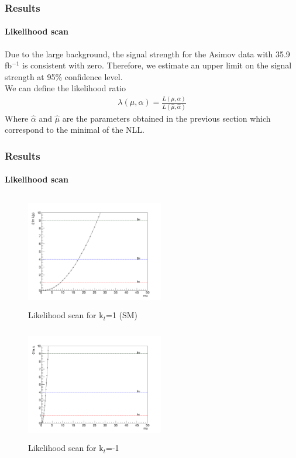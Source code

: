\documentclass[11pt]{beamer}
\begin{document}
\begin{frame}
\frametitle{Results}
\framesubtitle{Likelihood scan}
Due to the large background, the signal strength for the Asimov data with 35.9 fb$^{-1}$ is consistent with zero.
Therefore, we estimate an upper limit on the signal strength at 95$\%$ confidence level.\\

We can define the likelihood ratio
\begin{align}
\lambda(\mu,\alpha)=\frac{L(\mu,\alpha)}{L(\hat{\mu},\hat{\alpha})}
\end{align}
Where $\hat{\alpha}$ and $\hat{\mu}$ are the parameters obtained in the previous section which correspond to the minimal of the NLL.
\end{frame}


\begin{frame}
\frametitle{Results}
\framesubtitle{Likelihood scan}
\begin{minipage}{0.5\textwidth}
	\begin{center}
		\begin{figure}
			\includegraphics[width=6cm,height=5cm]{figures/Likelihood.png}
			\caption*{Likelihood scan for k$_t$=1 (SM)}
		\end{figure}
	\end{center}
\end{minipage}\hfill
\begin{minipage}{0.5\textwidth}
	\begin{center}
		\begin{figure}
			\includegraphics[width=6cm,height=5cm]{figures/kt-1/Likelihood-kt-1.png}
			\caption*{Likelihood scan for k$_t$=-1}
		\end{figure}
	\end{center}
\end{minipage}
\end{frame}
\end{document}
